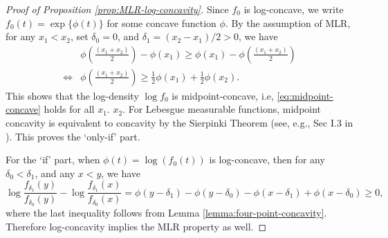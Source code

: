 \begin{proof}[Proof of Proposition \ref{prop:MLR-log-concavity}]
Since $f_0$ is log-concave, we write $f_0(t) = \exp\{\phi(t)\}$ for some concave function $\phi$.
By the assumption of MLR, for any $x_1 < x_2$, set $\delta_0 = 0$, and $\delta_1 = (x_2 - x_1)/2 > 0$, we have
\begin{align}
    &\phi\left(\frac{(x_1+x_2)}{2}\right)- \phi(x_1) \ge \phi(x_1)- \phi\left(\frac{(x_1+x_2)}{2}\right) \nonumber \\
    \iff 
    &\phi\left(\frac{(x_1+x_2)}{2}\right) \ge \frac{1}{2} \phi(x_1) + \frac{1}{2} \phi(x_2). \label{eq:midpoint-concave}
\end{align}
This shows that the log-density $\log{f_0}$ is midpoint-concave, i.e, \eqref{eq:midpoint-concave} holds for all $x_1$. $x_2$.
For Lebesgue measurable functions, midpoint concavity is equivalent to concavity by the Sierpinki Theorem (see, e.g., Sec I.3 in \citep{donoghue2014distributions}). This proves the `only-if' part.

For the `if' part, when  $\phi(t) = \log{(f_0(t))}$ is log-concave, then for any $\delta_0 < \delta_1$, and any $x<y$, we have
\begin{equation}
    \log{\frac{f_{\delta_1}(y)}{f_{\delta_0}(y)}} - \log{\frac{f_{\delta_1}(x)}{f_{\delta_0}(x)}}
    = \phi(y-\delta_1) - \phi(y-\delta_0) - \phi(x-\delta_1) + \phi(x-\delta_0) \ge 0,
\end{equation}
where the last inequality follows from Lemma \ref{lemma:four-point-concavity}.
Therefore log-concavity implies the MLR property as well.
\end{proof}


